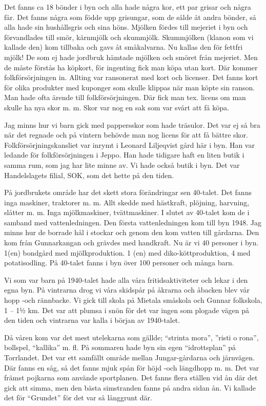 Det fanns ca 18 bönder i byn och alla hade några kor, ett par grisar och några får. Det fanns några som födde upp grisungar, som de sålde åt andra bönder, så alla hade sin hushållsgris och sina höns. Mjölken fördes till mejeriet i byn och förvandlades till smör, kärnmjölk och skummjölk. Skummjölken (klanon som vi kallade den) kom tillbaka och gavs åt småkalvarna. Nu kallas den för fettfri mjölk! De som ej hade jordbruk hämtade mjölken och smöret från mejeriet. Men de måste förstås ha köpkort, för ingenting fick man köpa utan kort. Där kommer folkförsörjningen in. Allting var ransonerat med kort och licenser. Det fanns kort för olika produkter med kuponger som skulle klippas när man köpte sin ranson. Man hade ofta ärende till folkförsörjningen. Där fick man tex. licens om man skulle ha nya skor m. m.  Skor var nog en sak som var svårt att få köpa.

Jag minns hur vi barn gick med pappersskor som hade träsulor. Det var ej så bra när det regnade och på vintern behövde man nog licens för att få bättre skor. Folkförsörjningskansliet var inrymt i Leonard Liljeqvist gård här i byn. Han var ledande för folkförsörjningen  i Jeppo. Han hade tidigare haft en liten butik i samma rum, som jag har lite minne av. Vi hade också butik i byn. Det var Handelslagets filial, SOK, som det hette på den tiden.

På jordbrukets område har det skett stora förändringar sen 40-talet. Det fanns inga maskiner, traktorer m. m.  Allt skedde med hästkraft, plöjning, harvning, slåtter m. m. Inga mjölkmaskiner, tvättmaskiner. I slutet av 40-talet kom de i samband med vattenledningen. Den första vattenledningen kom till byn 1948. Jag minns hur de borrade hål i stockar och genom den kom vatten till gårdarna. Den kom från Gunnarkangan och grävdes med handkraft. Nu är vi 40 personer i byn. 1(en) bondgård med mjölkproduktion. 1 (en) med diko-köttproduktion, 4 med potatisodling. På 40-talet fanns i byn över 100 personer och många barn.

Vi som var barn på 1940-talet hade alla våra fritidsaktiviteter och lekar i den egna byn. På vintrarna drog vi våra skidspår på åkrarna och åbacken blev vår hopp -och rännbacke. Vi gick till skola på Mietala småskola och Gunnar folkskola, 1 – 1½ km. Det var att plumsa i snön för det var ingen som plogade vägen på den tiden och vintrarna var kalla i början av 1940-talet.

Då våren kom var det mest utelekarna som gällde; ``strinta mora'', ”risti o rona”, bollspel, ``kallika'' m. fl.  På sommaren hade byn sin egen ``idrottsplan'' på Torrlandet. Det var ett samfällt område mellan Jungar-gårdarna och järnvägen. Där fanns en såg, så det fanns mjuk spån för höjd -och längdhopp m. m.  Det var främst pojkarna som använde sportplanen. Det fanns flera ställen vid ån där det gick att simma, men den bästa simstranden fanns på andra sidan ån. Vi kallade det för ``Grundet'' för det var så långgrunt där.

